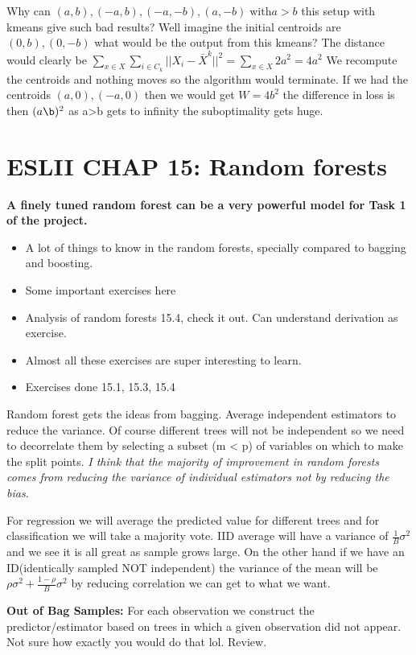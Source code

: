 \documentclass{article}
\begin{document}
Why can $(a,b),(-a,b),(-a,-b),(a,-b) \; \text{with} a > b$ this setup with kmeans 
give such bad results? Well imagine the initial centroids are $(0,b),(0,-b)$
what would be the output from this kmeans? The distance would clearly be $\sum_{x \in X} \sum_{i \in C_k}||X_i -\bar{X}^k ||^2 = \sum_{x \in X}2a^2 = 4a^2$ 
We recompute the centroids and nothing moves so the algorithm would terminate.
If we had the centroids $(a,0),(-a,0)$ then we would get $W = 4b^2$
the difference in loss is then $(a\b)^2$ as a>b gets to infinity the suboptimality gets huge.

\section*{ESLII CHAP 15: Random forests}
\textbf{A finely tuned random forest can be a very powerful model for Task 1 of the project.} 
\begin{itemize}
    \item A lot of things to know in the random forests, specially compared to bagging and boosting. 
    \item Some important exercises here
    \item Analysis of random forests 15.4, check it out. Can understand derivation as exercise.
    \item Almost all these exercises are super interesting to learn.
    \item Exercises done 15.1, 15.3, 15.4 
\end{itemize}
Random forest gets the ideas from bagging. Average independent estimators to reduce the variance. Of course different trees will not 
be independent so we need to decorrelate them by selecting a subset (m < p) of variables on which to make the split points. \textit{I think that the majority of improvement in random forests 
comes from reducing the variance of individual estimators not by reducing the bias.}

For regression we will average the predicted value for different trees and for classification we will take a majority vote.
IID average will have a variance of $\frac{1}{B}\sigma^2$ and we see it is all great as sample grows large. On the other hand if we have an ID(identically sampled NOT independent) 
the variance of the mean will be $\rho \sigma^2 + \frac{1 - \rho}{B}\sigma^2 $ by reducing correlation we can get to what we want. 

\textbf{Out of Bag Samples:}
For each observation we construct the predictor/estimator based on trees in which a given observation did not appear.
Not sure how exactly you would do that lol. Review. 
\end{document}
